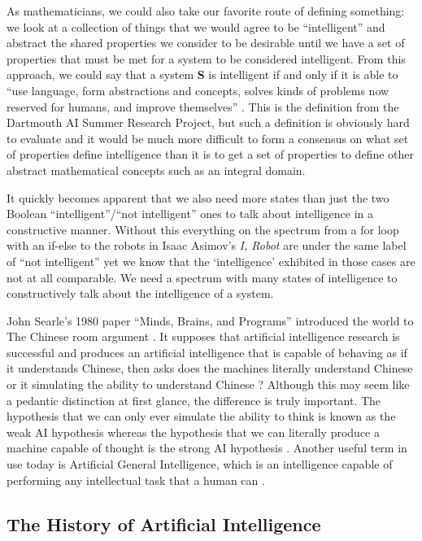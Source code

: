 \documentclass[fleqn,notitlepage,minimal]{article}
\begin{document}
	As mathematicians, we could also take our favorite route of defining something: we look at a collection of things that we would agree to be ``intelligent'' and abstract the shared properties we consider to be desirable until we have a set of properties that must be met for a system to be considered intelligent. From this approach, we could say that a system \textbf{S} is intelligent if and only if it is able to ``use language, form abstractions and concepts, solves kinds of problems now reserved for humans, and improve themselves'' \cite{Jones}. This is the definition from the Dartmouth AI Summer Research Project, but such a definition is obviously hard to evaluate and it would be much more difficult to form a consensus on what set of properties define intelligence than it is to get a set of properties to define other abstract mathematical concepts such as an integral domain.
	
	It quickly becomes apparent that we also need more states than just the two Boolean ``intelligent''/``not intelligent'' ones to talk about intelligence in a constructive manner. Without this everything on the spectrum from a for loop with an if-else to the robots in Isaac Asimov's \textit{I, Robot}  are under the same label of ``not intelligent'' yet we know that the `intelligence' exhibited in those cases are not at all comparable. We need a spectrum with many states of intelligence to constructively talk about the intelligence of a system.
	
	John Searle's 1980 paper ``Minds, Brains, and Programs'' introduced the world to The Chinese room argument \cite{Searle}. It supposes that artificial intelligence research is successful and produces an artificial intelligence that is capable of behaving as if it understands Chinese, then asks does the machines literally understand Chinese or it simulating the ability to understand Chinese \cite{Searle}? Although this may seem like a pedantic distinction at first glance, the difference is truly important. The hypothesis that we can only ever simulate the ability to think is known as the weak AI hypothesis whereas the hypothesis that we can literally produce a machine capable of thought is the strong AI hypothesis \cite{Jones}. Another useful term in use today is Artificial General Intelligence, which is an intelligence capable of performing any intellectual task that a human can \cite{Buchanan}.
	
	\subsection{The History of Artificial Intelligence}
	
\end{document}
